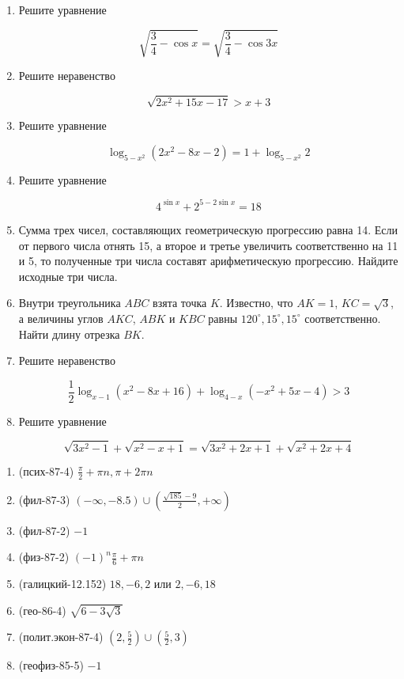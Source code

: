 \documentclass[11pt,a5paper]{report}
\begin{document}
\begin{enumerate}

\item Решите уравнение

$$\sqrt{\frac{3}{4}-\cos x} = \sqrt{\frac{3}{4}-\cos 3x}$$

\item Решите неравенство

$$\sqrt{2x^2+15x-17} > x+3$$

\item Решите уравнение

$$\log_{5-x^2}(2x^2-8x-2) = 1 + \log_{5-x^2}2$$

\item Решите уравнение

$$4^{\sin x}+2^{5-2\sin x}=18$$

\item Сумма трех чисел, составляющих геометрическую прогрессию равна 14. Если от первого числа отнять 15, а второе и третье увеличить соответственно на 11 и 5, то полученные три числа составят арифметическую прогрессию. Найдите исходные три числа.

\item Внутри треугольника $ABC$ взята точка $K$. Известно, что $AK = 1$, $KC = \sqrt{3}$, а величины углов $AKC$, $ABK$ и $KBC$ равны $120^{\circ}, 15^{\circ}, 15^{\circ}$ соответственно. Найти длину отрезка $BK$.

\item Решите неравенство

$$\frac{1}{2}\log_{x-1}(x^2-8x+16)+\log_{4-x}(-x^2+5x-4) > 3$$

\item Решите уравнение

$$\sqrt{3x^2-1}+\sqrt{x^2-x+1} = \sqrt{3x^2+2x+1}+\sqrt{x^2+2x+4}$$

\end{enumerate}

\newpage

\begin{enumerate}

\item (псих-87-4) $\frac{\pi}{2}+\pi n, \pi + 2\pi n$

\item (фил-87-3) $(-\infty, -8.5) \cup (\frac{\sqrt{185}-9}{2}, +\infty)$

\item (фил-87-2) $-1$

\item (физ-87-2) $(-1)^n\frac{\pi}{6}+\pi n$

\item (галицкий-12.152) $18, -6, 2$ или $2, -6, 18$

\item (гео-86-4) $\sqrt{6-3\sqrt{3}}$

\item (полит.экон-87-4) $(2, \frac{5}{2}) \cup (\frac{5}{2}, 3)$

\item (геофиз-85-5) $-1$

\end{enumerate}
\end{document}
